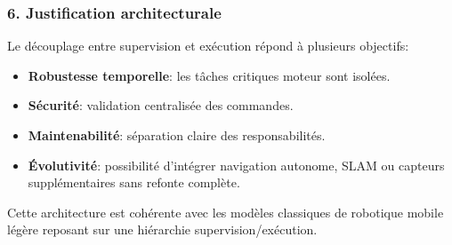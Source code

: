 \documentclass[12pt,a4paper]{article}
\begin{document}
\subsubsection*{6. Justification architecturale}

Le découplage entre supervision et exécution répond à plusieurs objectifs:

\begin{itemize}
    \item \textbf{Robustesse temporelle}: les tâches critiques moteur sont isolées.
    \item \textbf{Sécurité}: validation centralisée des commandes.
    \item \textbf{Maintenabilité}: séparation claire des responsabilités.
    \item \textbf{Évolutivité}: possibilité d’intégrer navigation autonome,
          SLAM ou capteurs supplémentaires sans refonte complète.
\end{itemize}

Cette architecture est cohérente avec les modèles
classiques de robotique mobile légère
reposant sur une hiérarchie supervision/exécution.





\end{document}

